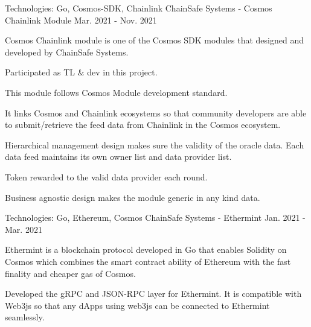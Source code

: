 \begin{cventries}
\cventry
    {Technologies: \quad Go, Cosmos-SDK, Chainlink}
    {ChainSafe Systems - Cosmos Chainlink Module}
    {}
    {Mar. 2021 - Nov. 2021}
    {
      \begin{cvitems}
        \item {Cosmos Chainlink module is one of the Cosmos SDK modules that designed and developed by ChainSafe Systems.}
        \item {Participated as TL \& dev in this project.}
        \item {This module follows Cosmos Module development standard.}
        \item {It links Cosmos and Chainlink ecosystems so that community developers are able to submit/retrieve the feed data from Chainlink in the Cosmos ecosystem.}
        \item {Hierarchical management design makes sure the validity of the oracle data. Each data feed maintains its own owner list and data provider list.}
        \item {Token rewarded to the valid data provider each round.}
        \item {Business agnostic design makes the module generic in any kind data.}
      \end{cvitems}
    }
    
\cventry
    {Technologies: \quad Go, Ethereum, Cosmos}
    {ChainSafe Systems - Ethermint}
    {}
    {Jan. 2021 - Mar. 2021}
    {
      \begin{cvitems}
        \item {Ethermint is a blockchain protocol developed in Go that enables Solidity on Cosmos which combines the smart contract ability of Ethereum with the fast finality and cheaper gas of Cosmos.}
        \item {Developed the gRPC and JSON-RPC layer for Ethermint. It is compatible with Web3js so that any dApps using web3js can be connected to Ethermint seamlessly.}
      \end{cvitems}
    }
    

\end{cventries}
